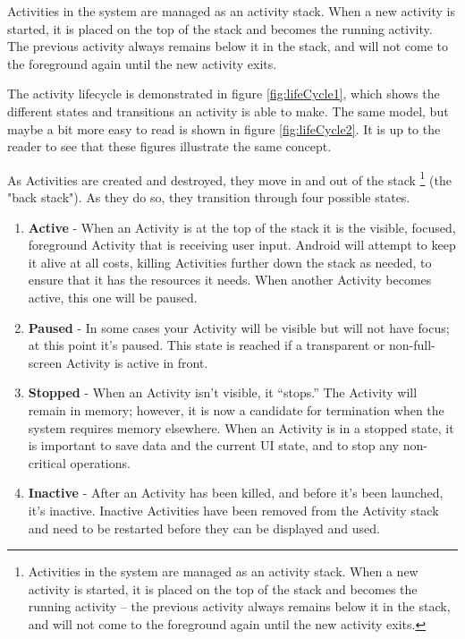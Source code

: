 Activities in the system are managed as an activity stack.
When a new activity is started, it is placed on the top of the stack and becomes the running activity.
The previous activity always remains below it in the stack, and will not come to the foreground again until the new activity exits.

The activity lifecycle is demonstrated in figure \ref{fig:lifeCycle1}, which shows the different states and transitions an activity is able to make.
The same model, but maybe a bit more easy to read is shown in figure \ref{fig:lifeCycle2}.
It is up to the reader to see that these figures illustrate the same concept.

As Activities are created and destroyed, they move in and out of the stack \footnote{Activities in the system are managed as an activity stack.
When a new activity is started, it is placed on the top of the stack and becomes the running activity -- the previous activity always remains below it in the stack, and will not come to the foreground again until the new activity exits.} (the "back stack").
As they do so, they transition through four possible states.

\begin{enumerate}
	\item \textbf{Active} - When an Activity is at the top of the stack it is the visible, focused, foreground Activity that is receiving user input.
		Android will attempt to keep it alive at all costs, killing Activities further down the stack as needed, to ensure that it has the resources it needs.
		When another Activity becomes active, this one will be paused.
	\item \textbf{Paused} - In some cases your Activity will be visible but will not have focus; at this point it’s paused.
		This state is reached if a transparent or non-full-screen Activity is active in front.
	\item \textbf{Stopped} - When an Activity isn’t visible, it “stops.” 
		The Activity will remain in memory; however, it is now a candidate for termination when the system requires memory elsewhere.
		When an Activity is in a stopped state, it is important to save data and the current UI state, and to stop any non-critical operations.
	\item \textbf{Inactive} - After an Activity has been killed, and before it’s been launched, it’s inactive.
		Inactive Activities have been removed from the Activity stack and need to be restarted before they can be displayed and used.
\end{enumerate}

